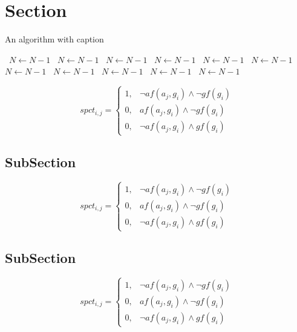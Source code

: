 \documentclass[a4paper]{article}
\begin{document}
\section{Section}

\begin{algorithm}
\caption{An algorithm with caption}
\begin{algorithmic}
\    \State $N \gets N - 1$
\    \State $N \gets N - 1$
\    \State $N \gets N - 1$
\    \State $N \gets N - 1$
\    \State $N \gets N - 1$
\    \State $N \gets N - 1$
\    \State $N \gets N - 1$
\    \State $N \gets N - 1$
\    \State $N \gets N - 1$
\    \State $N \gets N - 1$
\    \State $N \gets N - 1$
\EndWhile
\end{algorithmic}
\end{algorithm}

\begin{equation}
spct_{i,j} =
\begin{cases}
1, & \text{$\neg af(a_j,g_i) \wedge \neg gf(g_i)$}\\
0, & \text{$af(a_j,g_i) \wedge \neg gf(g_i)$}\\
0, & \text{$\neg af(a_j,g_i) \wedge gf(g_i)$}
\end{cases}
\end{equation}

\subsection{SubSection}

\begin{equation}
spct_{i,j} =
\begin{cases}
1, & \text{$\neg af(a_j,g_i) \wedge \neg gf(g_i)$}\\
0, & \text{$af(a_j,g_i) \wedge \neg gf(g_i)$}\\
0, & \text{$\neg af(a_j,g_i) \wedge gf(g_i)$}
\end{cases}
\end{equation}

\subsection{SubSection}

\begin{equation}
spct_{i,j} =
\begin{cases}
1, & \text{$\neg af(a_j,g_i) \wedge \neg gf(g_i)$}\\
0, & \text{$af(a_j,g_i) \wedge \neg gf(g_i)$}\\
0, & \text{$\neg af(a_j,g_i) \wedge gf(g_i)$}
\end{cases}
\end{equation}
\end{document}
